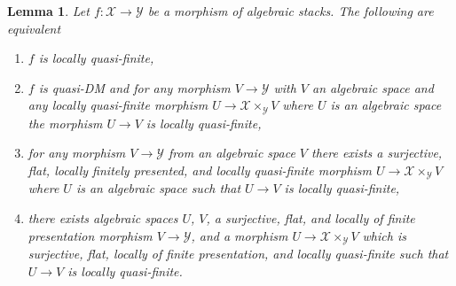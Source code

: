 \documentclass[10pt,a4paper]{amsart}
\theoremstyle{plain}
\newtheorem{lemma}[subsection]{Lemma}
\theoremstyle{definition}
\theoremstyle{remark}
\numberwithin{equation}{subsection}
\begin{document}
\begin{lemma}
\label{lemma-characterize-locally-quasi-finite}
Let $f : \mathcal{X} \to \mathcal{Y}$ be a morphism of algebraic stacks.
The following are equivalent
\begin{enumerate}
\item $f$ is locally quasi-finite,
\item $f$ is quasi-DM and for any morphism $V \to \mathcal{Y}$ with $V$
an algebraic space and any locally quasi-finite morphism
$U \to \mathcal{X} \times_\mathcal{Y} V$ where $U$ is an algebraic space
the morphism $U \to V$ is locally quasi-finite,
\item for any morphism $V \to \mathcal{Y}$ from an algebraic space $V$
there exists a surjective, flat, locally finitely presented, and locally
quasi-finite morphism $U \to \mathcal{X} \times_\mathcal{Y} V$ where
$U$ is an algebraic space such that $U \to V$ is locally quasi-finite,
\item there exists algebraic spaces $U$, $V$, a surjective, flat,
and locally of finite presentation morphism $V \to \mathcal{Y}$,
and a morphism $U \to \mathcal{X} \times_\mathcal{Y} V$ which
is surjective, flat, locally of finite presentation, and
locally quasi-finite such that $U \to V$ is locally quasi-finite.
\end{enumerate}
\end{lemma}
\end{document}
